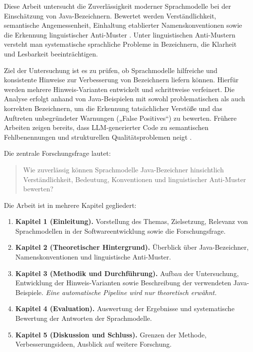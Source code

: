 \documentclass[a4paper,12pt]{article}
\begin{document}
Diese Arbeit untersucht die Zuverlässigkeit moderner Sprachmodelle bei der
Einschätzung von Java-Bezeichnern. Bewertet werden Verständlichkeit,
semantische Angemessenheit, Einhaltung etablierter Namenskonventionen
\cite{oracle} sowie die Erkennung linguistischer Anti-Muster
\cite{arnaoudova2014}. Unter linguistischen Anti-Mustern versteht man
systematische sprachliche Probleme in Bezeichnern, die Klarheit und Lesbarkeit
beeinträchtigen.

Ziel der Untersuchung ist es zu prüfen, ob Sprachmodelle hilfreiche und
konsistente Hinweise zur Verbesserung von Bezeichnern liefern können. Hierfür
werden mehrere Hinweis-Varianten entwickelt und schrittweise verfeinert. Die
Analyse erfolgt anhand von Java-Beispielen mit sowohl problematischen als auch
korrekten Bezeichnern, um die Erkennung tatsächlicher Verstöße und das
Auftreten unbegründeter Warnungen („False Positives“) zu bewerten. Frühere
Arbeiten zeigen bereits, dass LLM-generierter Code zu semantischen
Fehlbenennungen und strukturellen Qualitätsproblemen neigt
\cite{llmsmells2025,llmmethodnames2025,automaticprogramming2025}.

Die zentrale Forschungsfrage lautet:
\begin{quote}
    Wie zuverlässig können Sprachmodelle Java-Bezeichner hinsichtlich Verständlichkeit, Bedeutung, Konventionen und linguistischer Anti-Muster bewerten?
\end{quote}

Die Arbeit ist in mehrere Kapitel gegliedert:

\begin{enumerate}
    \item \textbf{Kapitel 1 (Einleitung).} Vorstellung des Themas, Zielsetzung, Relevanz von Sprachmodellen in der Softwareentwicklung sowie die Forschungsfrage.
    \item \textbf{Kapitel 2 (Theoretischer Hintergrund).} Überblick über Java-Bezeichner, Namenskonventionen und linguistische Anti-Muster.
    \item \textbf{Kapitel 3 (Methodik und Durchführung).} Aufbau der Untersuchung, Entwicklung der Hinweis-Varianten sowie Beschreibung der verwendeten Java-Beispiele. \textit{Eine automatische Pipeline wird nur theoretisch erwähnt.}
    \item \textbf{Kapitel 4 (Evaluation).} Auswertung der Ergebnisse und systematische Bewertung der Antworten der Sprachmodelle.
    \item \textbf{Kapitel 5 (Diskussion und Schluss).} Grenzen der Methode, Verbesserungsideen, Ausblick auf weitere Forschung.

\end{enumerate}
\end{document}
